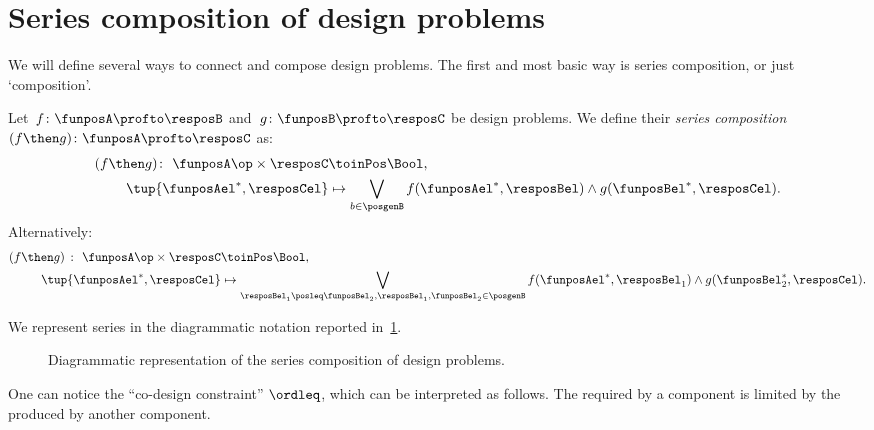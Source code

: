 \section{Series composition of design problems}
We will define several ways to connect and compose design problems. The first and most basic way is series composition, or just `composition'.

\begin{definition}
  \label{def:dp-series}
  Let~$f \colon  \funposA \profto \resposB$ and~$g \colon \funposB \profto \resposC$ be design problems. We define their \emph{series composition}~$(f\then g) \colon  \funposA \profto \resposC$ as:
  \begin{equation}
    \label{eq:composition2}
    \begin{aligned}
    (f \then g)
      \colon \ \funposA\op \times \resposC & \toinPos  \Bool, \\
      \tup{\funposAel^*, \resposCel} &\mapsto \bigvee_{b\in \posgenB} f(\funposAel^*,\resposBel) \wedge g(\funposBel^*,\resposCel).
    \end{aligned}
  \end{equation}
  Alternatively:
  \begin{equation}
    \begin{aligned}
      \label{eq:composition}
      (f \then g)\  \colon \ \funposA\op \times \resposC & \toinPos  \Bool,  \\
      \tup{\funposAel^*, \resposCel} &\mapsto \bigvee_{\resposBel_1\posleq\funposBel_2, \resposBel_1,\funposBel_2\in \posgenB} f(\funposAel^*,\resposBel_1) \wedge g(\funposBel_2^*,\resposCel).
    \end{aligned}
  \end{equation}
\end{definition}
We represent series in the diagrammatic notation reported in~\cref{fig:compositiondiagram}.

\begin{figure}[h!]
  \begin{center}
  \end{center}
  \caption{Diagrammatic representation of the series composition of design problems. \label{fig:compositiondiagram}}
\end{figure}

One can notice the ``co-design constraint'' $\ordleq$, which can be interpreted as follows.
The  required by a component is limited by the  produced by another component.

